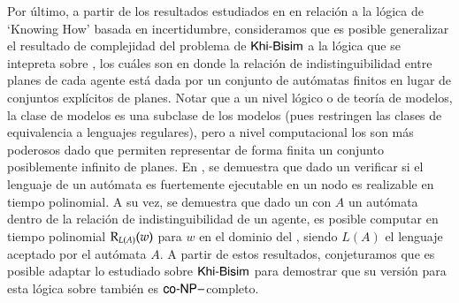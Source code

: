 Por último, a partir de los resultados estudiados en \cite{Demri_Fervari_2023} en relación a la lógica de `Knowing How' basada en incertidumbre, 
consideramos que es posible generalizar el resultado de complejidad del problema de $\rm\textsf{Khi-Bisim}$ a la lógica que se intepreta sobre \regults, los 
cuáles son \ults en donde la relación de indistinguibilidad entre planes de cada agente está dada por un conjunto de autómatas finitos en lugar 
de conjuntos explícitos de planes. 
Notar que a un nivel lógico o de teoría de modelos, la clase de modelos \regults es una subclase de los modelos \ults (pues restringen las clases de equivalencia 
a lenguajes regulares), pero a nivel computacional los \regults son más poderosos dado que permiten representar de forma finita un conjunto 
posiblemente infinito de planes. En \cite{Demri_Fervari_2023}, se demuestra que dado un \regults verificar si el lenguaje de un autómata 
es fuertemente ejecutable en un nodo es realizable en tiempo polinomial. A su vez, se demuestra que dado un \regults con $A$ un autómata dentro de la relación de indistinguibilidad de 
un agente, es posible computar en tiempo polinomial $\mathrm{R}_{L(A)}(w)$ para $w$ en el dominio del \regults, siendo $L(A)$ el lenguaje aceptado 
por el autómata $A$.
A partir de estos resultados, conjeturamos que es posible adaptar lo estudiado sobre $\rm\textsf{Khi-Bisim}$ para demostrar que su versión para 
esta lógica sobre \regults también es $\rm\textsf{co-NP}-$completo.